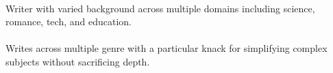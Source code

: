 \\[0.5em]

Writer with varied background across multiple domains including science,
romance, tech, and education. \\\\Writes across multiple genre with a particular
knack for simplifying complex subjects without sacrificing depth.